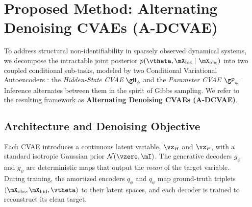 \section{Proposed Method: Alternating Denoising CVAEs (A-DCVAE)}
\label{sec:method}

To address structural non-identifiability in sparsely observed dynamical systems, we decompose the
intractable joint posterior $p(\vtheta, \mX_{\mathrm{hid}} \mid \mX_{\mathrm{obs}})$ into two coupled
conditional sub-tasks, modeled by two Conditional Variational Autoencoders \citep[CVAEs;][]{kingma2014auto, sohn2015learning}: the
\textit{Hidden-State CVAE} $\gH_\phi$ and the \textit{Parameter CVAE} $\gP_\psi$. Inference
alternates between them in the spirit of Gibbs sampling. We refer to the resulting framework as
\textbf{Alternating Denoising CVAEs (A-DCVAE)}.

\subsection{Architecture and Denoising Objective}
\label{subsec:architecture}

Each CVAE introduces a continuous latent variable, $\vz_H$ and $\vz_P$, with a standard isotropic
Gaussian prior $\mathcal{N}(\vzero, \mI)$. The generative decoders $g_\phi$ and $g_\psi$ are
deterministic maps that output the \textit{mean} of the target variable. During training, the
amortized encoders $q_\phi$ and $q_\psi$ map ground-truth triplets
$(\mX_{\mathrm{obs}}, \mX_{\mathrm{hid}}, \vtheta)$ to their latent spaces, and each decoder is
trained to reconstruct its clean target.

